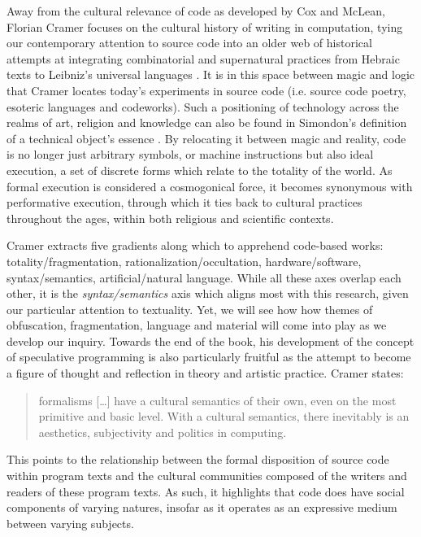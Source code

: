 Away from the cultural relevance of code as developed by Cox and McLean, Florian Cramer focuses on the cultural history of writing in computation, tying our contemporary attention to source code into an older web of historical attempts at integrating combinatorial and supernatural practices from Hebraic texts to Leibniz's universal languages \citep{cramer_words_2003}. It is in this space between magic and logic that Cramer locates today's experiments in source code (i.e. source code poetry, esoteric languages and codeworks). Such a positioning of technology across the realms of art, religion and knowledge can also be found in Simondon's definition of a technical object's essence \citep{simondon_mode_1958}. By relocating it between magic and reality, code is no longer just arbitrary symbols, or machine instructions but also ideal execution, a set of discrete forms which relate to the totality of the world. As formal execution is considered a cosmogonical force, it becomes synonymous with performative execution, through which it ties back to cultural practices throughout the ages, within both religious and scientific contexts.

Cramer extracts five gradients along which to apprehend code-based works: totality/fragmentation, rationalization/occultation, hardware/software, syntax/semantics, artificial/natural language. While all these axes overlap each other, it is the \emph{syntax/semantics} axis which aligns most with this research, given our particular attention to textuality. Yet, we will see how how themes of obfuscation, fragmentation, language and material will come into play as we develop our inquiry. Towards the end of the book, his development of the concept of speculative programming is also particularly fruitful as the attempt to become a figure of thought and reflection in theory and artistic practice. Cramer states:

\begin{quote}
    formalisms [\dots] have a cultural semantics of their own, even on the most primitive and basic level. With a cultural semantics, there inevitably is an aesthetics, subjectivity and politics in computing. \citep{cramer_words_2003}
\end{quote}

This points to the relationship between the formal disposition of source code within program texts and the cultural communities composed of the writers and readers of these program texts. As such, it highlights that code does have social components of varying natures, insofar as it operates as an expressive medium between varying subjects.

